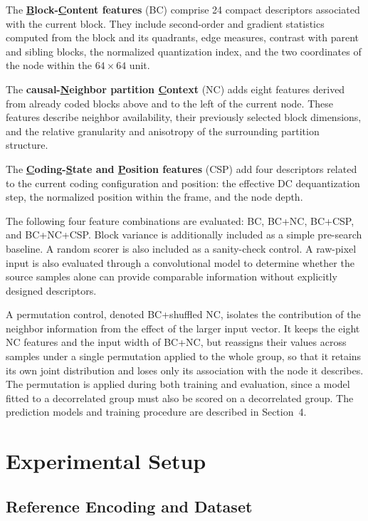 \documentclass{article}
\begin{document}
The \textbf{\underline{B}lock-\underline{C}ontent features} (BC) comprise 24 compact descriptors associated with the current block. They include second-order and gradient statistics computed from the block and its quadrants, edge measures, contrast with parent and sibling blocks, the normalized quantization index, and the two coordinates of the node within the $64\times64$ unit.

The \textbf{causal-\underline{N}eighbor partition \underline{C}ontext} (NC) adds eight features derived from already coded blocks above and to the left of the current node. These features describe neighbor availability, their previously selected block dimensions, and the relative granularity and anisotropy of the surrounding partition structure.

The \textbf{\underline{C}oding-\underline{S}tate and \underline{P}osition features} (CSP) add four descriptors related to the current coding configuration and position: the effective DC dequantization step, the normalized position within the frame, and the node depth.

The following four feature combinations are evaluated: BC, BC+NC, BC+CSP, and BC+NC+CSP. Block variance is additionally included as a simple pre-search baseline. A random scorer is also included as a sanity-check control. A raw-pixel input is also evaluated through a convolutional model to determine whether the source samples alone can provide comparable information without explicitly designed descriptors.

A permutation control, denoted BC+shuffled NC, isolates the contribution of the neighbor information from the effect of the larger input vector. It keeps the eight NC features and the input width of BC+NC, but reassigns their values across samples under a single permutation applied to the whole group, so that it retains its own joint distribution and loses only its association with the node it describes. The permutation is applied during both training and evaluation, since a model fitted to a decorrelated group must also be scored on a decorrelated group. The prediction models and training procedure are described in Section~4.

\section{Experimental Setup}

\subsection{Reference Encoding and Dataset}
\end{document}
